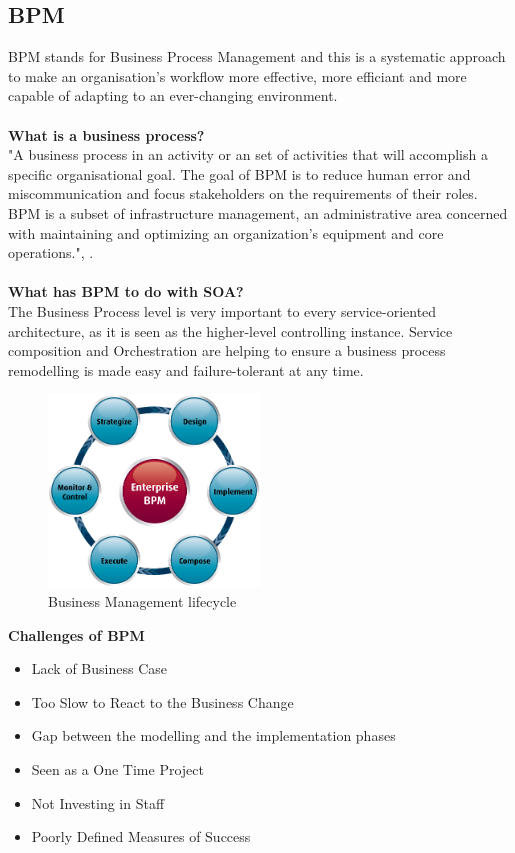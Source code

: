 \documentclass[12pt]{article}
\begin{document}
\subsection{BPM}
BPM stands for Business Process Management and this is a systematic approach to make an organisation's workflow more effective, more efficiant and more capable of adapting to an ever-changing environment. 
\\ \\\textbf{What is a business process?}\\
"A business process in an activity or an set of activities that will accomplish a specific organisational goal. The goal of BPM is to reduce human error and miscommunication and focus stakeholders on the requirements of their roles. BPM is a subset of infrastructure management, an administrative area concerned with maintaining and optimizing an organization's equipment and core operations.", \cite{bpmdef}.
\\ \\\textbf{What has BPM to do with SOA?}\\
The Business Process level is very important to every service-oriented architecture, as it is seen as the higher-level controlling instance. Service composition and Orchestration are helping to ensure a business process remodelling is made easy and failure-tolerant at any time. \cite[page 114]{te}
\begin{figure}
	\centering
	\includegraphics[width=0.5\textwidth]{images/bpm.png}
	\caption{Business Management lifecycle \cite{muede2}}
	\label{fig:anfang}
	\end{figure}
	\FloatBarrier \noindent
\textbf{Challenges of BPM \cite{bpmchall}}
\begin{itemize}
\item Lack of Business Case
\item Too Slow to React to the Business Change
\item Gap between the modelling and the implementation phases
\item Seen as a One Time Project 
\item Not Investing in Staff
\item Poorly Defined Measures of Success 
\end{itemize}
\end{document}
